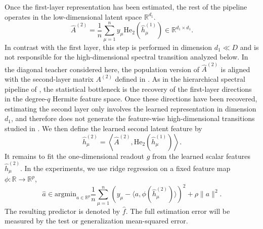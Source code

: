 \documentclass[]{article}
\numberwithin{equation}{section}
\theoremstyle{definition}
\newcommand{\RR}{\mathbb{R}}
\newcommand{\He}{\mathord{\mathrm{He}}}
\newcommand{\para}[1]{\left(#1\right)}
\begin{document}
Once the first-layer representation has been estimated, the rest of the pipeline operates in the low-dimensional latent space $\RR^{d_1}$.
\begin{equation}
    \widehat A^{(2)}
    =
    \frac1n\sum_{\mu=1}^n y_\mu \He_2\para{\widehat h^{(1)}_\mu}
    \in \RR^{d_1\times d_1}.
    \label{eq:def_A2_hat}
\end{equation}
In contrast with the first layer, this step is performed in dimension $d_1\ll D$ and is not responsible for the high-dimensional spectral transition analyzed below. In the diagonal teacher considered here, the population version of $\widehat A^{(2)}$ is aligned with the second-layer matrix $A^{(2)}$ defined in . As in the hierarchical spectral pipeline of \citep{tabanelli2026deep}, the statistical bottleneck is the recovery of the first-layer directions in the degree-$q$ Hermite feature space. Once these directions have been recovered, estimating the second layer only involves the learned representation in dimension $d_1$, and therefore does not generate the feature-wise high-dimensional transitions studied in . We then define the learned second latent feature by
\begin{equation}
    \widehat h^{(2)}_\mu
    =
    \left\langle \widehat A^{(2)},\He_2\para{\widehat h^{(1)}_\mu}\right\rangle.
    \label{eq:def_hhat_second_layer}
\end{equation}
It remains to fit the one-dimensional readout $g$ from the learned scalar features $\widehat h^{(2)}_\mu$. In the experiments, we use ridge regression on a fixed feature map $\phi:\RR\to\RR^p$,
\begin{equation}
    \widehat a
    \in
    \mathrm{argmin}_{a\in\RR^p}
    \frac1n\sum_{\mu=1}^n
    \para{y_\mu-\langle a,\phi(\widehat h^{(2)}_\mu)\rangle}^2
    +
    \rho\|a\|^2.
    \label{eq:ridge_readout}
\end{equation}
The resulting predictor is denoted by $\widehat f$. The full estimation error will be measured by the test or generalization mean-squared error.


\end{document}
